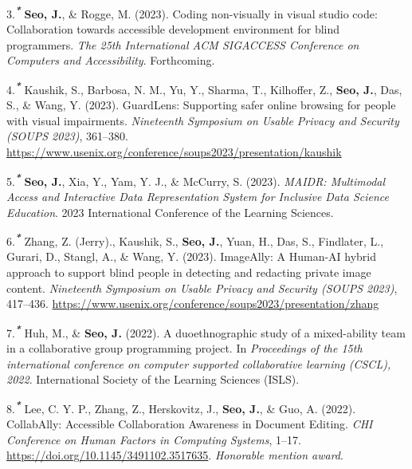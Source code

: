 \documentclass[11pt,a4paper,]{awesome-cv}
\begin{document}
\leavevmode{}%
3.\textsuperscript{\textbf{\emph{*}}} \textbf{Seo, J.}, \& Rogge, M.
(2023). Coding non-visually in visual studio code: Collaboration towards
accessible development environment for blind programmers. \emph{The 25th
International ACM SIGACCESS Conference on Computers and Accessibility}.
Forthcoming.

\leavevmode{}%
4.\textsuperscript{\textbf{\emph{*}}} Kaushik, S., Barbosa, N. M., Yu,
Y., Sharma, T., Kilhoffer, Z., \textbf{Seo, J.}, Das, S., \& Wang, Y.
(2023). GuardLens: Supporting safer online browsing for people with
visual impairments. \emph{Nineteenth Symposium on Usable Privacy and
Security (SOUPS 2023)}, 361--380.
\url{https://www.usenix.org/conference/soups2023/presentation/kaushik}

\leavevmode{}%
5.\textsuperscript{\textbf{\emph{*}}} \textbf{Seo, J.}, Xia, Y., Yam, Y.
J., \& McCurry, S. (2023). \emph{MAIDR: Multimodal Access and
Interactive Data Representation System for Inclusive Data Science
Education}. 2023 International Conference of the Learning Sciences.

\leavevmode{}%
6.\textsuperscript{\textbf{\emph{*}}} Zhang, Z. (Jerry)., Kaushik, S.,
\textbf{Seo, J.}, Yuan, H., Das, S., Findlater, L., Gurari, D., Stangl,
A., \& Wang, Y. (2023). ImageAlly: A Human-AI hybrid approach to support
blind people in detecting and redacting private image content.
\emph{Nineteenth Symposium on Usable Privacy and Security (SOUPS 2023)},
417--436.
\url{https://www.usenix.org/conference/soups2023/presentation/zhang}

\leavevmode{}%
7.\textsuperscript{\textbf{\emph{*}}} Huh, M., \& \textbf{Seo, J.}
(2022). A duoethnographic study of a mixed-ability team in a
collaborative group programming project. In \emph{Proceedings of the
15th international conference on computer supported collaborative
learning (CSCL), 2022}. International Society of the Learning Sciences
(ISLS).

\leavevmode{}%
8.\textsuperscript{\textbf{\emph{*}}} Lee, C. Y. P., Zhang, Z.,
Herskovitz, J., \textbf{Seo, J.}, \& Guo, A. (2022). CollabAlly:
Accessible Collaboration Awareness in Document Editing. \emph{CHI
Conference on Human Factors in Computing Systems}, 1--17.
\url{https://doi.org/10.1145/3491102.3517635}. \emph{Honorable mention
award}.
\end{document}
